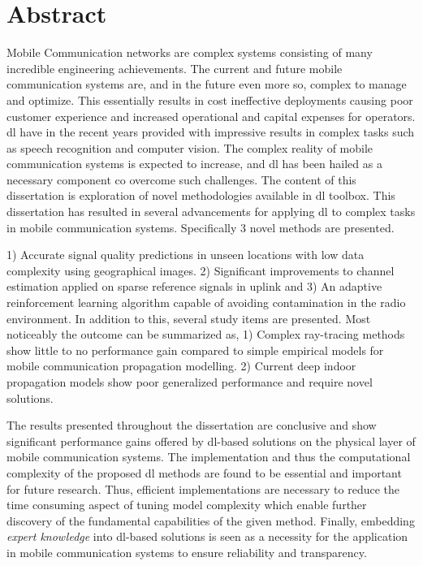 \chapter*{Abstract}
Mobile Communication networks are complex systems consisting of many incredible engineering achievements. The current and future mobile communication systems are, and in the future even more so, complex to manage and optimize. This essentially results in cost ineffective deployments causing poor customer experience and increased operational and capital expenses for operators. \acrfull{dl} have in the recent years provided with impressive results in complex tasks such as speech recognition and computer vision. The complex reality of mobile communication systems is expected to increase, and \gls{dl} has been hailed as a necessary component co overcome such challenges. The content of this dissertation is exploration of novel methodologies available in \acrshort{dl} toolbox. This dissertation has resulted in several advancements for applying \gls{dl} to complex tasks in mobile communication systems. Specifically 3 novel methods are presented. 

1) Accurate signal quality predictions in unseen locations with low data complexity using geographical images. 2) Significant improvements to channel estimation applied on sparse reference signals in uplink and 3) An adaptive reinforcement learning algorithm capable of avoiding contamination in the radio environment. In addition to this, several study items are presented. Most noticeably the outcome can be summarized as, 1) Complex ray-tracing methods show little to no performance gain compared to simple empirical models for mobile communication propagation modelling. 2) Current deep indoor propagation models show poor generalized performance and require novel solutions.

The results presented throughout the dissertation are conclusive and show significant performance gains offered by \gls{dl}-based solutions on the physical layer of mobile communication systems. The implementation and thus the computational complexity of the proposed \gls{dl} methods are found to be essential and important for future research. Thus, efficient implementations are necessary to reduce the time consuming aspect of tuning model complexity which enable further discovery of the fundamental capabilities of the given method. Finally, embedding \emph{expert knowledge} into \gls{dl}-based solutions is seen as a necessity for the application in mobile communication systems to ensure reliability and transparency.